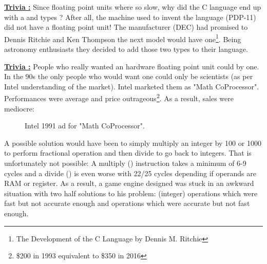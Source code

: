 \documentclass[book.tex]{subfiles}
\begin{document}
 \textbf{\underline{Trivia :}} Since floating point units where so slow, why did the C language end up with a  and  types ? After all, the machine used to invent the language (PDP-11) did not have a floating point unit! The manufacturer (DEC) had promised to Dennis Ritchie and Ken Thompson the next model would have one\footnote{The Development of the C Language by Dennis M. Ritchie}. Being astronomy enthusiasts they decided to add those two types to their language.\\
\par


\textbf{\underline{Trivia :}} People who really wanted an hardware floating point unit could by one. In the 90s the only people who would want one could only be scientists (as per Intel understanding of the market). Intel marketed them as "Math CoProcessor". Performances were average and price outrageous\footnote{\$200 in 1993 equivalent to \$350 in 2016}. As a result, sales were mediocre:\\
\begin{figure}[H]
\centering
\caption{Intel 1991 ad for "Math CoProcessor".}
\label{fig:fp_internals}
\end{figure}



\par
A possible solution would have been to simply multiply an integer by 100 or 1000 to perform fractional operation and then divide to go back to integers. That is unfortunately not possible: A multiply () instruction takes a minimum of 6-9 cycles and a divide () is even worse with 22/25 cycles depending if operands are RAM or register. As a result, a game engine designed was stuck in an awkward situation with two half solutions to his problem: (integer) operations which were fast but not accurate enough and  operations which were accurate but not fast enough.\\
\par
  
\end{document}
